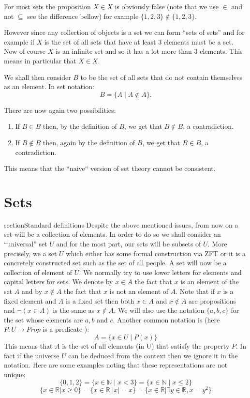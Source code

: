  For most sets the proposition $X \in X$ is obviously false (note that we use $\in$ and not $\subseteq$ see the difference bellow) for example $\{1,2,3\}\not \in \{1,2,3\}$. 

However since any collection of objects is a set we can form ``sets of sets'' and for example if $X$ is the set of all sets that have at least 3 elements must be a set. Now of course $X$ is an infinite set and so it has a lot more than 3 elements. This means in particular that $X\in X$.

 We shall then consider $B$ to be the set of all sets that do not contain themselves as an element. In set notation:
$$B= \{A \mid A\not\in A\}.$$

There are now again two possibilities:

\begin{enumerate}
\item If $B\in B$ then, by the definition of $B$, we get that $B\not\in B$, a contradiction.
\item If $B\not\in B$ then, again by the definition of $B$, we get that $B \in B$, a contradiction.

\end{enumerate}

This means that the ``naive`` version of set theory cannot be consistent.
 
\section{Sets}\label{sec:sets}
section{Standard definitions}
Despite the above mentioned issues, from now on a set will be a collection of elements. In order to do so we shall consider an ``universal'' set $U$ and for the most part, our sets will be subsets of $U$. More precisely, we a set $U$ which either has some formal construction via ZFT or it is a concretely constructed set such as the set of all people. A set will now be a collection of element of $U$.  We normally try to use lower letters for elements and capital letters for sets. We denote by $x\in A$ the fact that $x$ is an element of the set $A$ and by $x \not \in A$ the fact that $x$ is not an element of $A$. Note that if $x$ is a fixed element and $A$ is a fixed set then both $x\in A$ and $x \not\in A$ are propositions and $\neg (x \in A) $ is the same as $x \not \in A$. We will also use the notation $\{a, b, c\}$ for the set whose elements are $a,b$ and $c$. Another common notation is (here $P:U\rightarrow Prop$ is a predicate ):
$$A=\{x\in U \mid P(x)\}$$
This means that $A$ is the set of all elements (in U) that satisfy the property $P$. In fact if the universe $U$ can be deduced from the context then we ignore it in the notation. Here are some examples noting that these representations are not unique:
$$\{0, 1,2\}= \{  x \in \mathbb{N} \mid x< 3\}= \{  x \in \mathbb{N} \mid x\le2\}$$
$$ \{x \in \mathbb{R}| x\ge 0\}=  \{x \in \mathbb{R}| |x|=x\}= \{x \in \mathbb{R}| \exists y \in \mathbb{R}, x=y^{2}\}  $$


